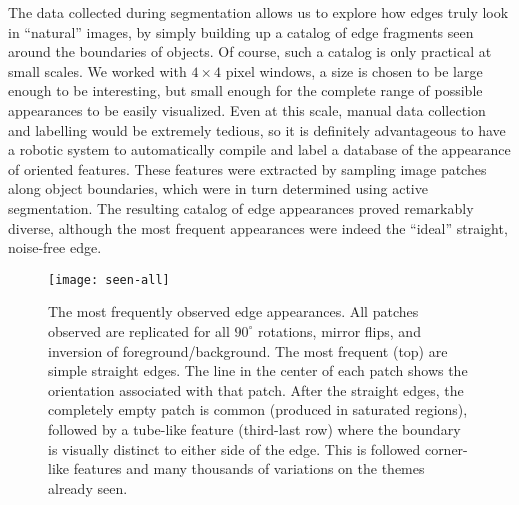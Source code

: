 The data collected during segmentation allows us to explore how edges truly
look in ``natural'' images, by simply building up a catalog of edge
fragments seen around the boundaries of objects.  Of course, such a
catalog is only practical at small scales.  We worked with $4\times 4$
pixel windows, a size is chosen to be large enough to be interesting,
but small enough for the complete range of possible appearances to be
easily visualized.  Even at this scale, manual data collection and
labelling would be extremely tedious, so it is definitely advantageous
to have a robotic system to automatically compile and label a database
of the appearance of oriented features.
%
These features were extracted by sampling image patches
along object boundaries, which were in turn determined 
using active segmentation.
The resulting catalog of edge appearances proved remarkably
diverse, although the most frequent appearances were indeed
the ``ideal'' straight, noise-free edge.


\ifnote
\begin{figure}[tb]
\begin{center}
\texttt{[image: seen-all]}
\caption{
\label{fig:lines-all}
%
The most frequently observed edge appearances.  All patches
observed are replicated for all $90^{\circ}$ rotations, mirror flips,
and inversion of foreground/background.
%
The most frequent (top) are simple straight edges.
%
The line in the center of
each patch shows the orientation associated with that patch.  
%
After the straight edges, the completely empty patch
is common (produced in saturated regions), 
followed by a tube-like feature (third-last row)
where the boundary is visually distinct to either side of
the edge.
This is followed corner-like features and
many thousands of variations on the themes already seen.  
%
}
\end{center}
\end{figure}
\fi

